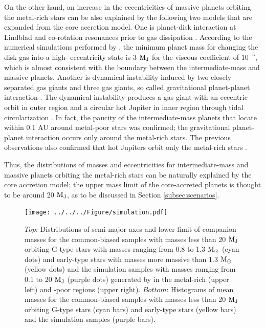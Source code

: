 \documentclass[twocolumn, dvipdfmx]{aastex62}
\begin{document}
\begin{CJK*}{UTF8}{min}
On the other hand, an increase in the eccentricities of massive planets orbiting the metal-rich stars can be also explained by the following two models that are expanded from the core accretion model. One is planet-disk interaction at Lindblad and co-rotation resonances prior to gas dissipation \citep[e.g.,][]{2003ApJ...585.1024G}. According to the numerical simulations performed by \cite{2006A&A...447..369K}, the minimum planet mass for changing the disk gas into a high- eccentricity state is 3 $\rm M_J$ for the viscous coefficient of $10^{-5}$, which is almost consistent with the boundary between the intermediate-mass and massive planets. Another is dynamical instability induced by two closely separated gas giants and three gas giants, so called gravitational planet-planet interaction \citep[e.g.,][]{2013ApJ...775...42I}. The dynamical instability produces a gas giant with an eccentric orbit in outer region and a circular hot Jupiter in inner region through tidal circularization \citep[e.g.,][]{1996Sci...274..954R}. In fact, the paucity of the intermediate-mass planets that locate within 0.1 AU around metal-poor stars was confirmed; the gravitational planet-planet interaction occurs only around the metal-rich stars. The previous observations also confirmed that hot Jupiters orbit only the metal-rich stars \citep{2013ApJ...767L..24D, 2013A&A...560A..51A}.

Thus, the distributions of masses and eccentricities for intermediate-mass and massive planets orbiting the metal-rich stars can be naturally explained by the core accretion model; the upper mass limit of the core-accreted planets is thought to be around 20 $\rm M_J$, as to be discussed in Section \ref{subsec:scenarios}.

\begin{figure}[t]
\begin{center}
\texttt{[image: ../../../Figure/simulation.pdf]}
\caption{$Top$: Distributions of semi-major axes and lower limit of companion masses for the common-biased samples with masses less than 20 $\rm M_J$ orbiting G-type stars with masses ranging from 0.8 to 1.3 $\rm M_{\odot}$ (cyan dots) and early-type stars with masses more massive than 1.3 $\rm M_{\odot}$ (yellow dots) and the simulation samples with masses ranging from 0.1 to 20 $\rm M_J$ (purple dots) generated by \cite{2012A&A...541A..97M} in the metal-rich (upper left) and -poor regions (upper right). $Bottom$: Histograms of mean masses for the common-biased samples with masses less than 20 $\rm M_J$ orbiting G-type stars (cyan bars) and early-type stars (yellow bars) and the simulation samples (purple bars). \label{fig:simulation}}
\end{center}
\end{figure}



\end{CJK*}
\end{document}
